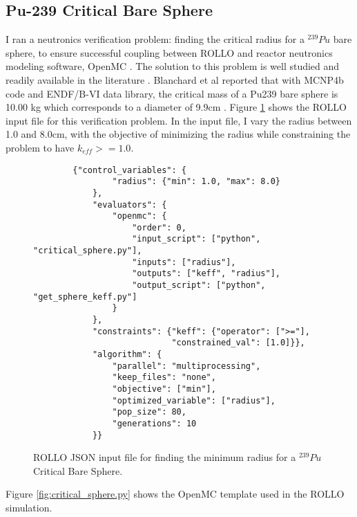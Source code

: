 \subsection{Pu-239 Critical Bare Sphere}
I ran a neutronics verification problem: finding the critical radius for a $^{239}Pu$ 
bare sphere, to ensure successful coupling between \gls{ROLLO} and reactor neutronics 
modeling software, OpenMC \cite{romano_openmc:_2015}. 
The solution to this problem is well studied and readily available in the 
literature \cite{blanchard_updated_1999}. 
Blanchard et al reported that with MCNP4b code and ENDF/B-VI data library, the 
critical mass of a Pu239 bare sphere is 10.00 kg which corresponds to a diameter 
of 9.9cm \cite{blanchard_updated_1999}.
Figure \ref{fig:verification-sphere} shows the ROLLO input file for this verification 
problem. 
In the input file, I vary the radius between 1.0 and 8.0cm, with the objective of 
minimizing the radius while constraining the problem to have $k_{eff} >= 1.0$.
\begin{figure}[htbp]
    \begin{verbatim}
        {"control_variables": {
                "radius": {"min": 1.0, "max": 8.0}
            },
            "evaluators": {
                "openmc": {
                    "order": 0,
                    "input_script": ["python", "critical_sphere.py"],
                    "inputs": ["radius"],
                    "outputs": ["keff", "radius"],
                    "output_script": ["python", "get_sphere_keff.py"]
                }
            },
            "constraints": {"keff": {"operator": [">="], 
                            "constrained_val": [1.0]}},
            "algorithm": {
                "parallel": "multiprocessing",
                "keep_files": "none",
                "objective": ["min"],
                "optimized_variable": ["radius"],
                "pop_size": 80,
                "generations": 10
            }}
    \end{verbatim}
    \caption{\acrfull{ROLLO} JSON input file for finding the minimum radius for 
    a $^{239}Pu$ Critical Bare Sphere.}
    \label{fig:verification-sphere}
\end{figure}
\pagebreak
Figure \ref{fig:critical_sphere.py} shows the OpenMC template used in the 
\gls{ROLLO} simulation. 

